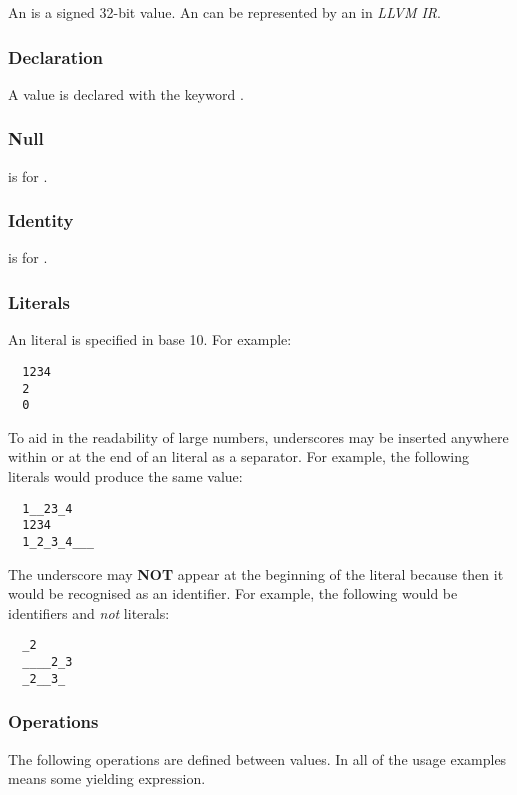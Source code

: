\documentclass[types.tex]{subfiles}
\begin{document}
An  is a signed 32-bit value. An  can be represented by an  in
\textit{LLVM IR}.

\subsubsection{Declaration}
\label{sssec:integer_decl}
A  value is declared with the keyword .

\subsubsection{Null}
\label{sssec:integer_null}
 is  for .

\subsubsection{Identity}
\label{sssec:integer_ident}
 is  for .

\subsubsection{Literals}
\label{sssec:int_lit}
An  literal is specified in base 10. For example:
\begin{lstlisting}
  1234
  2
  0
\end{lstlisting}

To aid in the readability of large numbers, underscores may be inserted anywhere within or at the
end of an  literal as a separator. For example, the following literals would produce
the same  value:
\begin{lstlisting}
  1__23_4
  1234
  1_2_3_4___
\end{lstlisting}

The underscore may \textbf{NOT} appear at the beginning of the  literal because then
it would be recognised as an identifier. For example, the following would be identifiers and
\textit{not}  literals:
\begin{lstlisting}
  _2
  ____2_3
  _2__3_
\end{lstlisting}

\subsubsection{Operations}
The following operations are defined between  values. In all of the usage examples
 means some  yielding expression.
\end{document}
